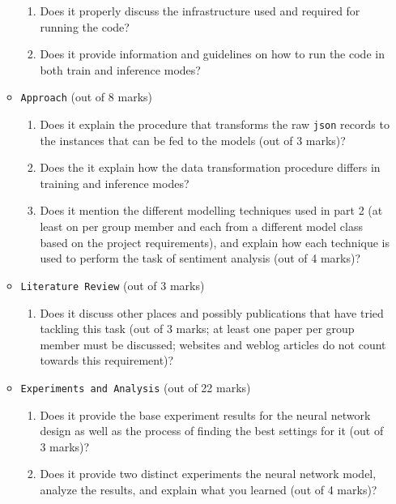 \begin{itemize}
\begin{itemize}
        \begin{enumerate}
            \item Does it properly discuss the infrastructure used and required for running the code?
            \answerTODO{}
            \item Does it provide information and guidelines on how to run the code in both train and inference modes?
            \answerTODO{}
        \end{enumerate}
        \item \texttt{Approach} (out of 8 marks)
        \begin{enumerate}
            \item Does it explain the procedure that transforms the raw \texttt{json} records to the instances that can be fed to the models (out of 3 marks)?
            \answerTODO{}
            \item Does the it explain how the data transformation procedure differs in training and inference modes?
            \answerTODO{}
            \item Does it mention the different modelling techniques used in part 2 (at least on per group member and each from a different model class based on the project requirements), and explain how each technique is used to perform the task of sentiment analysis (out of 4 marks)?
                \answerTODO{}
        \end{enumerate}
        \item \texttt{Literature Review} (out of 3 marks) 
        \begin{enumerate}
            \item Does it discuss other places and possibly publications that have tried tackling this task (out of 3 marks; at least one paper per group member must be discussed; websites and weblog articles do not count towards this requirement)?
                \answerTODO{}
        \end{enumerate}
        \item \texttt{Experiments and Analysis} (out of 22 marks)
        \begin{enumerate}
            \item Does it provide the base experiment results for the neural network design as well as the process of finding the best settings for it (out of 3 marks)?
                \answerTODO{}
            \item Does it provide two distinct experiments the neural network model, analyze the results, and explain what you learned (out of 4 marks)?

\end{enumerate}
\end{itemize}
\end{itemize}
